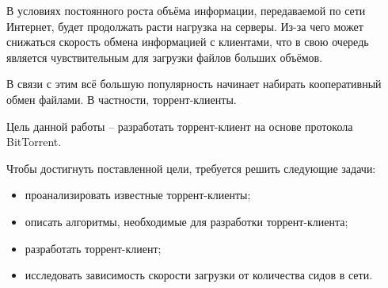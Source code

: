 
В условиях постоянного роста объёма информации, передаваемой по сети Интернет, будет продолжать расти нагрузка на серверы. Из-за чего может снижаться скорость обмена информацией с клиентами, что в свою очередь является чувствительным для загрузки файлов больших объёмов.

В связи с этим всё большую популярность начинает набирать кооперативный обмен файлами. В частности, торрент-клиенты.

Цель данной работы – разработать торрент-клиент на основе протокола BitTorrent.

Чтобы достигнуть поставленной цели, требуется решить следующие задачи:
\begin{itemize}
	\item проанализировать известные торрент-клиенты;
	\item описать алгоритмы, необходимые для разработки торрент-клиента;
	\item разработать торрент-клиент;
	\item исследовать зависимость скорости загрузки от количества сидов в сети.
\end{itemize}